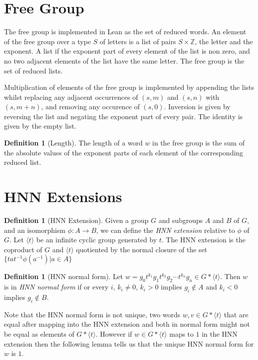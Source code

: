 \documentclass[11pt]{article} %
\theoremstyle{definition}
\theoremstyle{definition}
\theoremstyle{definition}
\theoremstyle{definition}
\theoremstyle{definition}
\newtheorem{defn}[theorem]{Definition}
\theoremstyle{definition}
\begin{document}
\section{Free Group}

The free group is implemented in Lean as the set of reduced words. An element of
the free group over a type $S$ of letters is a list of pairs $S \times \mathbb{Z}$,
the letter and the exponent.
A list if the exponent part of every element of the list is non zero, and
no two adjacent elements of the list have the same letter. The free group is the set of
reduced lists.

Multiplication of elements of the free group is implemented by appending the lists
whilst replacing any adjacent occurrences of $(s, m)$ and $(s, n)$ with $(s, m + n)$, and removing
any occurence of $(s, 0)$. Inversion is given by reversing the list and negating
the exponent part of every pair. The identity is given by the empty list.

\begin{defn}[Length]\label{length}
  The length of a word $w$ in the free group is the sum of the absolute values of the exponent
  parts of each element of the corresponding reduced list.
\end{defn}

\section{HNN Extensions}\label{HNN}

\begin{defn}[HNN Extension]
  Given a group $G$ and subgroups $A$ and $B$ of $G$, and an isomorphism $\phi : A \to B$, we can define
  the \textit{HNN extension} relative to $\phi$ of $G$. Let $\langle t \rangle$ be an infinite cyclic
  group generated by $t$. The HNN extension is the coproduct
  of $G$ and $\langle t \rangle$ quotiented
  by the normal closure of the set $\{ta t^{-1} \phi(a^{-1}) | a \in A\}$
\end{defn}

\begin{defn}[HNN normal form]\label{HNNnormalform}
  Let $w = g_0t^{k_1}g_1t^{k_2}g_2 \cdots t^{k_n}g_n \in G \ast \langle t \rangle$.
  Then $w$ is in \textit{HNN normal form} if or every $i$, $k_i \ne 0$, $k_i > 0$
  implies $g_i \notin A$ and $k_i < 0$ implies $g_i \notin B$.
\end{defn}

Note that the HNN normal form is not unique, two words $w, v \in G \ast \langle t \rangle$
that are equal after mapping into the HNN extension and both in normal form might not be
equal as elements of $G \ast \langle t \rangle$. However if $w \in G \ast \langle t \rangle $
maps to $1$ in the HNN extension
then the following lemma tells us that the unique HNN normal form for $w$ is $1$.
\end{document}

